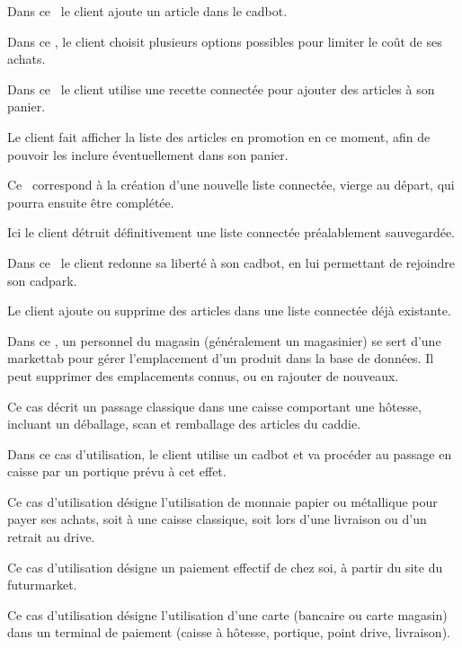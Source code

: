 Dans ce \cu\ le client ajoute un article dans le cadbot.

Dans ce \cu, le client choisit plusieurs options possibles pour limiter le coût de ses achats.

Dans ce  \cu\ le client utilise une recette connectée pour ajouter des articles à son panier.

Le client fait afficher la liste des articles en promotion en ce moment, afin de pouvoir les inclure éventuellement dans son panier.

Ce \cu\ correspond à la création d'une nouvelle liste connectée, vierge au départ, qui pourra ensuite être complétée.

Ici le client détruit définitivement une liste connectée préalablement sauvegardée.

\TODO

Dans ce \cu\ le client redonne sa liberté à son cadbot, en lui permettant de rejoindre son cadpark.

Le client ajoute ou supprime des articles dans une liste connectée déjà existante.

Dans ce \cu, un personnel du magasin (généralement un magasinier) se sert d'une markettab pour gérer l'emplacement d'un produit dans la base de données.
Il peut supprimer des emplacements connus, ou en rajouter de nouveaux.

Ce cas décrit un passage classique dans une caisse comportant une hôtesse, incluant un déballage, scan et remballage des articles du caddie.

Dans ce cas d'utilisation, le client utilise un cadbot et va procéder au passage en caisse par un portique prévu à cet effet. 

Ce cas d'utilisation désigne l'utilisation de monnaie papier ou métallique pour payer ses achats, soit à une caisse classique, soit lors d'une livraison ou d'un retrait au drive.

Ce cas d'utilisation désigne un paiement effectif de chez soi, à partir du site du futurmarket.

Ce cas d'utilisation désigne l'utilisation d'une carte (bancaire ou carte magasin) dans un terminal de paiement (caisse à hôtesse, portique, point drive, livraison).

